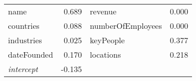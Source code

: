 \begin{center}
\begin{tabular}{lrlr}
name & 0.689       & revenue & 0.000\\
countries & 0.088  & numberOfEmployees & 0.000\\
industries & 0.025 & keyPeople & 0.377\\
dateFounded & 0.170& locations & 0.218\\
\textit{intercept} & -0.135 &  & 
\end{tabular}
\end{center}

%









